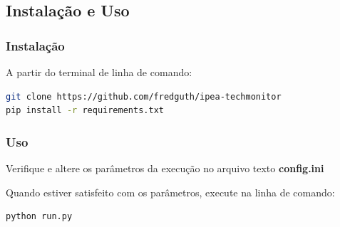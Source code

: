 \documentclass[paper=a4, fontsize=11pt]{scrartcl}
\numberwithin{equation}{section}		%
\numberwithin{figure}{section}			%
\numberwithin{table}{section}				%
\begin{document}
\subsection{Instalação e Uso}

\subsubsection{Instalação}
A partir do terminal de linha de comando:
\begin{lstlisting}[language=bash, frame=leftline, basicstyle=\footnotesize\ttfamily] 
git clone https://github.com/fredguth/ipea-techmonitor
pip install -r requirements.txt
\end{lstlisting}

\subsubsection{Uso}
Verifique e altere os parâmetros da execução no arquivo texto \textbf{config.ini}

Quando estiver satisfeito com os parâmetros, execute na linha de comando:
\begin{lstlisting}[language=bash, frame=leftline,basicstyle=\footnotesize\ttfamily] 
python run.py
\end{lstlisting}



\end{document}
